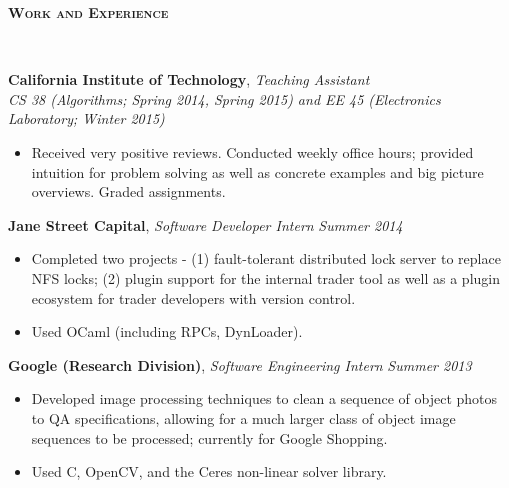 \documentclass{article}
\newenvironment{changemargin}[2]{%
  \begin{list}{}{%
    \setlength{\topsep}{0pt}%
    \setlength{\leftmargin}{#1}%
    \setlength{\rightmargin}{#2}%
    \setlength{\listparindent}{\parindent}%
    \setlength{\itemindent}{\parindent}%
    \setlength{\parsep}{\parskip}%
  }%
  \item[]}{\end{list}
}
\newcommand{\lineover}{
	\begin{changemargin}{-0.05in}{-0.05in}
		\vspace*{-8pt}
		\hrulefill \\
		\vspace*{-2pt}
	\end{changemargin}
}
\newcommand{\header}[1]{
	\begin{changemargin}{-.5in}{-0.5in}
		{\large \textbf{\scshape{#1}}}\\
  	\lineover
	\end{changemargin}
}
\newenvironment{body} {
	\vspace*{-16pt}
	\begin{changemargin}{-0.25in}{-0.5in}
  }	
	{\end{changemargin}
}
\newcommand{\CC}{C\nolinebreak\hspace{-.05em}\raisebox{.4ex}{\tiny\bf +}\nolinebreak\hspace{-.10em}\raisebox{.4ex}{\tiny\bf +}}
\begin{document}
\smallskip


\header{Work and Experience}

\begin{body}
	\vspace{14pt}
	\textbf{California Institute of Technology}, \emph{Teaching Assistant} \\
	\emph{CS 38 (Algorithms; Spring 2014, Spring 2015) and EE 45 (Electronics Laboratory; Winter 2015)}
	\vspace*{-4pt}
	\begin{itemize}
		\item Received very positive reviews. Conducted weekly office hours; provided intuition for problem solving as well as concrete examples and big picture overviews. Graded assignments.
	\end{itemize}

	\smallskip

	\textbf{Jane Street Capital}, \emph{Software Developer Intern} \hfill \emph{Summer 2014}\\
	\vspace*{-4pt}
	\begin{itemize}
		\item Completed two projects - (1) fault-tolerant distributed lock server to replace NFS locks; (2) plugin support for the internal trader tool as well as a plugin ecosystem for trader developers with version control.
		\item Used OCaml (including RPCs, DynLoader).
	\end{itemize}

	\smallskip

	\textbf{Google (Research Division)}, \emph{Software Engineering Intern} \hfill \emph{Summer 2013}\\
	\vspace*{-4pt}
	\begin{itemize}
		\item Developed image processing techniques to clean a sequence of object photos to QA specifications, allowing for a much larger class of object image sequences to be processed; currently for Google Shopping.
		\item Used \CC, OpenCV, and the Ceres non-linear solver library.
	\end{itemize}

	\smallskip


\end{body}
\end{document}
